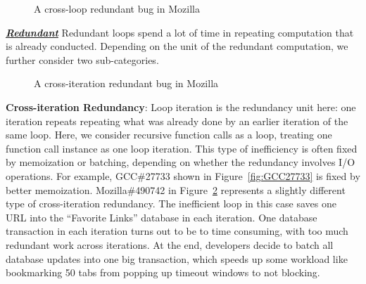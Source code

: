 \begin{figure}[h]
\centering
{}
  \mbox{}
\caption{A cross-loop redundant bug in Mozilla }
\label{fig:Mozilla477564}
\end{figure}

\underline{\textit{\textbf{Redundant}}}
Redundant loops spend a lot of time in repeating computation that is already
conducted.
Depending on the unit of the redundant computation, we further consider 
two sub-categories.



\begin{figure}[h]
\centering
{}
  \mbox{}
\caption{A cross-iteration redundant bug in Mozilla }
\label{fig:Mozilla490742}
\end{figure}

{\textbf{Cross-iteration Redundancy}}:
Loop iteration is the redundancy unit here:
one iteration repeats
repeating what was already done by an earlier iteration of the same loop.
Here, we consider recursive function calls as a loop, treating one function 
call instance as one loop iteration. 
This type of inefficiency is often fixed by memoization or batching, depending
on whether the redundancy involves I/O operations.
For example, GCC\#27733 shown in Figure~\ref{fig:GCC27733} 
is fixed by better memoization. 
Mozilla\#490742 in Figure~\ref{fig:Mozilla490742} represents a slightly different type of cross-iteration
redundancy. The inefficient loop in this case saves one URL into the ``Favorite
Links'' database in each iteration. One database transaction in each iteration
turns out to be to time consuming, with too much redundant work across
iterations. At the end, developers decide to batch all database updates into 
one big transaction, which speeds up some workload like 
bookmarking 50 tabs 
from popping up timeout windows to not blocking.

